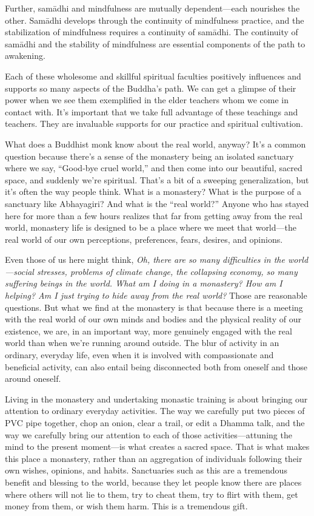 Further, samādhi and mindfulness are mutually dependent---each 
nourishes the other. Samādhi develops through the continuity of 
mindfulness practice, and the stabilization of mindfulness requires a 
continuity of samādhi. The continuity of samādhi and the stability of 
mindfulness are essential components of the path to awakening.

Each of these wholesome and skillful spiritual faculties positively 
influences and supports so many aspects of the Buddha's path. We can 
get a glimpse of their power when we see them exemplified in the elder 
teachers whom we come in contact with. It's important that we take full 
advantage of these teachings and teachers. They are invaluable supports 
for our practice and spiritual cultivation.


What does a Buddhist monk know about the real world, anyway? It's a 
common question because there's a sense of the monastery being an 
isolated sanctuary where we say, ``Good-bye cruel world,'' and then 
come into our beautiful, sacred space, and suddenly we're spiritual. 
That's a bit of a sweeping generalization, but it's often the way 
people think. What is a monastery? What is the purpose of a sanctuary 
like Abhayagiri? And what is the ``real world?'' Anyone who has stayed 
here for more than a few hours realizes that far from getting away from 
the real world, monastery life is designed to be a place where we meet 
that world---the real world of our own perceptions, preferences, fears, 
desires, and opinions.

Even those of us here might think, \emph{Oh, there are so many 
difficulties in the world---social stresses, problems of climate 
change, the collapsing economy, so many suffering beings in the world. 
What am I doing in a monastery? How am I helping? Am I just trying to 
hide away from the real world?} Those are reasonable questions. But 
what we find at the monastery is that because there is a meeting with 
the real world of our own minds and bodies and the physical reality of 
our existence, we are, in an important way, more genuinely engaged with 
the real world than when we're running around outside. The blur of 
activity in an ordinary, everyday life, even when it is involved with 
compassionate and beneficial activity, can also entail being 
disconnected both from oneself and those around oneself.

Living in the monastery and undertaking monastic training is about 
bringing our attention to ordinary everyday activities. The way we 
carefully put two pieces of PVC pipe together, chop an onion, clear a 
trail, or edit a Dhamma talk, and the way we carefully bring our 
attention to each of those activities---attuning the mind to the 
present moment---is what creates a sacred space. That is what makes 
this place a monastery, rather than an aggregation of individuals 
following their own wishes, opinions, and habits. Sanctuaries such as 
this are a tremendous benefit and blessing to the world, because they 
let people know there are places where others will not lie to them, try 
to cheat them, try to flirt with them, get money from them, or wish 
them harm. This is a tremendous gift.

